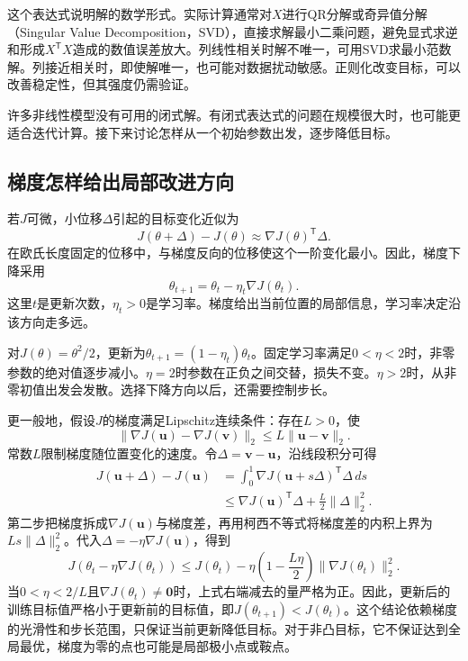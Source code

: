 这个表达式说明解的数学形式。实际计算通常对$X$进行QR分解或奇异值分解（Singular Value Decomposition，SVD），直接求解最小二乘问题，避免显式求逆和形成$X^{\mathsf T}X$造成的数值误差放大。列线性相关时解不唯一，可用SVD求最小范数解。列接近相关时，即使解唯一，也可能对数据扰动敏感。正则化改变目标，可以改善稳定性，但其强度仍需验证。

许多非线性模型没有可用的闭式解。有闭式表达式的问题在规模很大时，也可能更适合迭代计算。接下来讨论怎样从一个初始参数出发，逐步降低目标。

\subsection{梯度怎样给出局部改进方向}
若$J$可微，小位移$\Delta$引起的目标变化近似为
\begin{equation}
 J(\theta+\Delta)-J(\theta)\approx\nabla J(\theta)^{\mathsf T}\Delta.
\end{equation}
在欧氏长度固定的位移中，与梯度反向的位移使这个一阶变化最小。因此，梯度下降采用
\begin{equation}
 \theta_{t+1}=\theta_t-\eta_t\nabla J(\theta_t).
 \label{eq:solving-gradient-descent}
\end{equation}
这里$t$是更新次数，$\eta_t>0$是学习率。梯度给出当前位置的局部信息，学习率决定沿该方向走多远。

对$J(\theta)=\theta^2/2$，更新为$\theta_{t+1}=(1-\eta_t)\theta_t$。固定学习率满足$0<\eta<2$时，非零参数的绝对值逐步减小。$\eta=2$时参数在正负之间交替，损失不变。$\eta>2$时，从非零初值出发会发散。选择下降方向以后，还需要控制步长。

更一般地，假设$J$的梯度满足Lipschitz连续条件：存在$L>0$，使
\begin{equation}
 \|\nabla J(\bm u)-\nabla J(\bm v)\|_2\leq L\|\bm u-\bm v\|_2.
\end{equation}
常数$L$限制梯度随位置变化的速度。令$\Delta=\bm v-\bm u$，沿线段积分可得
\begin{align}
 J(\bm u+\Delta)-J(\bm u)
 &=\int_0^1\nabla J(\bm u+s\Delta)^{\mathsf T}\Delta\,ds\\
 &\leq\nabla J(\bm u)^{\mathsf T}\Delta+\frac L2\|\Delta\|_2^2.
\end{align}
第二步把梯度拆成$\nabla J(\bm u)$与梯度差，再用柯西不等式将梯度差的内积上界为$Ls\|\Delta\|_2^2$。代入$\Delta=-\eta\nabla J(\bm u)$，得到
\begin{equation}
 J(\theta_t-\eta\nabla J(\theta_t))
 \leq J(\theta_t)-\eta\left(1-\frac{L\eta}{2}\right)\|\nabla J(\theta_t)\|_2^2.
 \label{eq:solving-descent-bound}
\end{equation}
当$0<\eta<2/L$且$\nabla J(\theta_t)\ne\bm0$时，上式右端减去的量严格为正。因此，更新后的训练目标值严格小于更新前的目标值，即$J(\theta_{t+1})<J(\theta_t)$。这个结论依赖梯度的光滑性和步长范围，只保证当前更新降低目标。对于非凸目标，它不保证达到全局最优，梯度为零的点也可能是局部极小点或鞍点。

